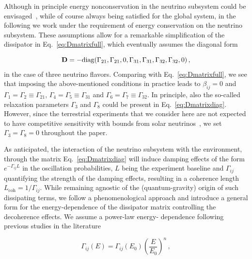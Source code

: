 \documentclass[aps, prd, onecolumn, tightenlines, notitlepage, superscriptaddress, nofootinbib, preprintnumbers, floatfix,showkeys,11pt]{revtex4-2}
\begin{document}
Although in principle energy nonconservation in the neutrino subsystem could be envisaged~\cite{Benatti:2000ph,Oliveira:2010zzd}, while of course always being satisfied for the global system, in the following we work under the requirement of energy conservation on the neutrino subsystem. These assumptions allow for a remarkable simplification of the dissipator in Eq.~\eqref{eq:Dmatrixfull}, which eventually assumes the diagonal form~\cite{BalieiroGomes:2016ykp,Oliveira:2016asf,BalieiroGomes:2018gtd}


\begin{equation}
 \label{eq:Dmatrixdiag}
	{\bf{D}}= -\mathrm{diag}(\Gamma_{21},\Gamma_{21},0,\Gamma_{31}, \Gamma_{31},\Gamma_{32},\Gamma_{32},0) \,,
\end{equation}
in the case of three neutrino flavors. Comparing with Eq.~\eqref{eq:Dmatrixfull}, we see that imposing the above-mentioned conditions in practice leads to $\beta_{ij}=0$ and $\Gamma_1 = \Gamma_2 \equiv \Gamma_{21}$, $\Gamma_4 = \Gamma_5 \equiv \Gamma_{31}$ and $\Gamma_6 = \Gamma_7 \equiv \Gamma_{32}$. In principle, also the so-called relaxation parameters $\Gamma_{3}$ and $\Gamma_{8}$ could be present in Eq.~\eqref{eq:Dmatrixdiag}. However, since the terrestrial experiments that we consider here are not expected to have competitive sensitivity with bounds from solar neutrinos~\cite{deHolanda:2019tuf}, we set $\Gamma_3 = \Gamma_8 = 0$ throughout the paper.

As anticipated, the interaction of the neutrino subsystem with the environment, through the matrix Eq.~\eqref{eq:Dmatrixdiag} will induce damping effects of the form $e^{-\Gamma_{ij} L}$ in the oscillation probabilities, $L$ being the experiment baseline and $\Gamma_{ij}$ quantifying the strength of the damping effects, resulting in a coherence length $L_\mathrm{coh} = 1/\Gamma_{ij}$. While remaining agnostic of the (quantum-gravity) origin of such dissipating terms, we follow a phenomenological approach and introduce a general form for the energy-dependence of the dissipator matrix controlling the decoherence effects. We assume a power-law energy-
dependence following previous studies in the literature~\cite{Lisi:2000zt,Fogli:2007tx,Coloma:2018idr,Guzzo:2014jbp,Carrasco:2018sca,Gomes:2020muc,Stuttard:2020qfv}

\begin{equation}
\label{eq:gamma_E}
\Gamma_{ij}(E) = \Gamma_{ij}(E_0) \left( \frac{E}{E_0} \right)^n \, ,
\end{equation}
\end{document}
